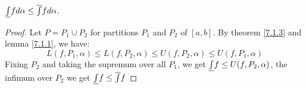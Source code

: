 \begin{theorem}\label{7.1.4}
    $\underline{\int}{f}d\alpha \leq \overline{\int}{f}d\alpha$.
\end{theorem}
\begin{proof}
    Let $P=P_1 \cup P_2$ for partitions $P_1$ and $P_2$ of $[a,b]$. By theorem
    \ref{7.1.3} and lemma  \ref{7.1.1}, we have:
        \begin{equation}
            L(f,P_1,\alpha) \leq L(f,P_2,\alpha) \leq U(f,P_2, \alpha) \leq
            U(f,P_1, \alpha)
        \end{equation}
        Fixing $P_2$ and taking the supremum over all $P_1$, we get
        $\underline{\int}{f} \leq U(f,P_2,\alpha)$, the infimum over $P_2$ we
        get $\underline{\int}{f} \leq \overline{\int}{f}$
\end{proof}
